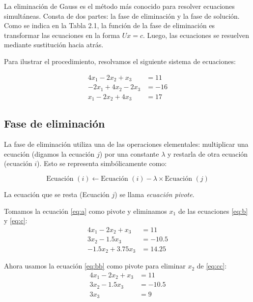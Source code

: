 \documentclass[12pt,letterpaper]{article}
\theoremstyle{definition}
\theoremstyle{plain}
\theoremstyle{remark}
\begin{document}
La eliminación de Gauss es el método más conocido para resolver ecuaciones simultáneas. Consta de dos partes: la fase de eliminación y la fase de solución. Como se indica en la Tabla 2.1, la función de la fase de eliminación es transformar las ecuaciones en la forma $Ux = c$. Luego, las ecuaciones se resuelven mediante sustitución hacia atrás.

Para ilustrar el procedimiento, resolvamos el siguiente sistema de ecuaciones:

\begin{align}
4x_1 - 2x_2 + x_3 &= 11 \label{eq:a} \tag{a} \\
-2x_1 + 4x_2 - 2x_3 &= -16 \label{eq:b} \tag{b}\\
x_1 - 2x_2 + 4x_3 &= 17 \label{eq:c} \tag{c}
\end{align}

\subsection*{Fase de eliminación}

La fase de eliminación utiliza una de las operaciones elementales: multiplicar una ecuación (digamos la ecuación $j$) por una constante $\lambda$ y restarla de otra ecuación (ecuación $i$). Esto se representa simbólicamente como:

\begin{equation}
    \text{Ecuación }(i) \leftarrow \text{Ecuación }(i) - \lambda \times \text{Ecuación }(j) \label{eq:1.3} \tag{1.3}
\end{equation}

La ecuación que se resta (Ecuación $j$) se llama \textit{ecuación pivote}.

Tomamos la ecuación \eqref{eq:a} como pivote y eliminamos $x_1$ de las ecuaciones \eqref{eq:b} y \eqref{eq:c}:
\begin{align}
4x_1 - 2x_2 + x_3 &= 11 \label{eq:aa} \tag{a} \\
3x_2 - 1.5x_3 &= -10.5 \label{eq:bb} \tag{b}\\
-1.5x_2 + 3.75x_3 &= 14.25 \label{eq:cc} \tag{c}
\end{align}

Ahora usamos la ecuación \eqref{eq:bb} como pivote para eliminar $x_2$ de \eqref{eq:cc}:
\begin{align*}
4x_1 - 2x_2 + x_3 &= 11 \\
3x_2 - 1.5x_3 &= -10.5 \\
3x_3 &= 9
\end{align*}
\end{document}
